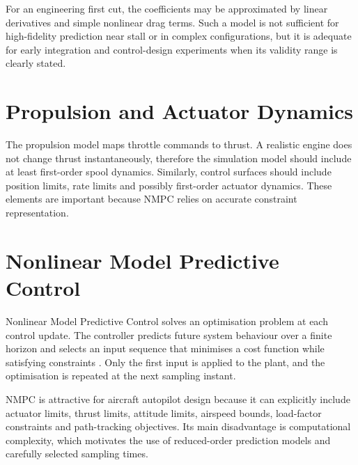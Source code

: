 For an engineering first cut, the coefficients may be approximated by linear derivatives and simple nonlinear drag terms. Such a model is not sufficient for high-fidelity prediction near stall or in complex configurations, but it is adequate for early integration and control-design experiments when its validity range is clearly stated.

\section{Propulsion and Actuator Dynamics}

The propulsion model maps throttle commands to thrust. A realistic engine does not change thrust instantaneously, therefore the simulation model should include at least first-order spool dynamics. Similarly, control surfaces should include position limits, rate limits and possibly first-order actuator dynamics. These elements are important because NMPC relies on accurate constraint representation.

\section{Nonlinear Model Predictive Control}

Nonlinear Model Predictive Control solves an optimisation problem at each control update. The controller predicts future system behaviour over a finite horizon and selects an input sequence that minimises a cost function while satisfying constraints \cite{rawlings2017mpc,grune2017nmpc}. Only the first input is applied to the plant, and the optimisation is repeated at the next sampling instant.

NMPC is attractive for aircraft autopilot design because it can explicitly include actuator limits, thrust limits, attitude limits, airspeed bounds, load-factor constraints and path-tracking objectives. Its main disadvantage is computational complexity, which motivates the use of reduced-order prediction models and carefully selected sampling times.
